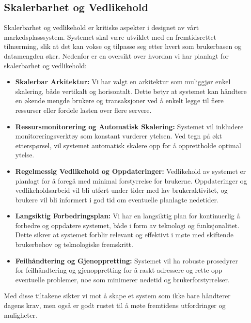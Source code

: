 \documentclass[../doc.tex]{subfiles}
\begin{document}
\subsection{Skalerbarhet og Vedlikehold}
Skalerbarhet og vedlikehold er kritiske aspekter i designet av vårt markedsplasssystem. Systemet skal være utviklet med en fremtidsrettet tilnærming, slik at det kan vokse og tilpasse seg etter hvert som brukerbasen og datamengden øker. Nedenfor er en oversikt over hvordan vi har planlagt for skalerbarhet og vedlikehold:

\begin{itemize}
    \item \textbf{Skalerbar Arkitektur:} Vi har valgt en arkitektur som muliggjør enkel skalering, både vertikalt og horisontalt. 
    Dette betyr at systemet kan håndtere en økende mengde brukere og transaksjoner ved å enkelt legge til flere ressurser eller fordele lasten over flere servere.

    \item \textbf{Ressursmonitorering og Automatisk Skalering:} Systemet vil inkludere monitoreringsverktøy som konstant vurderer ytelsen. 
    Ved tegn på økt etterspørsel, vil systemet automatisk skalere opp for å opprettholde optimal ytelse.

    \item \textbf{Regelmessig Vedlikehold og Oppdateringer:} Vedlikehold av systemet er planlagt for å foregå med minimal forstyrrelse for brukerne. 
    Oppdateringer og vedlikeholdsarbeid vil bli utført under tider med lav brukeraktivitet, og brukere vil bli informert i god tid om eventuelle planlagte nedetider.

    \item \textbf{Langsiktig Forbedringsplan:} Vi har en langsiktig plan for kontinuerlig å forbedre og oppdatere systemet, både i form av teknologi og funksjonalitet. 
    Dette sikrer at systemet forblir relevant og effektivt i møte med skiftende brukerbehov og teknologiske fremskritt.

    \item \textbf{Feilhåndtering og Gjenoppretting:} Systemet vil ha robuste prosedyrer for feilhåndtering 
    og gjenoppretting for å raskt adressere og rette opp eventuelle problemer, noe som minimerer nedetid og brukerforstyrrelser.
\end{itemize}

Med disse tiltakene sikter vi mot å skape et system som ikke bare håndterer dagens krav, men også er godt rustet til å møte fremtidens utfordringer og muligheter.
\end{document}
